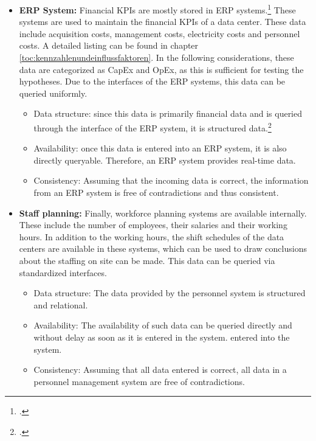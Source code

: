 \begin{itemize}
    \item \textbf{ERP System: }Financial \acp{KPI} are mostly stored in \ac{ERP} systems.\footcite[Cf.][Table 3]{spathis2003usefulness}
    These systems are used to maintain the financial \acp{KPI}
    of a data center. These data include acquisition costs, management costs,
    electricity costs and personnel costs. A detailed listing can be found in
    chapter \ref{toc:kennzahlenundeinflussfaktoren}. In the following considerations, these data are categorized as
    \ac{CapEx} and \ac{OpEx}, as this is sufficient for testing the hypotheses. Due to the interfaces
    of the ERP systems, this data can be queried uniformly.
    \begin{itemize}
        \item Data structure: since this data is primarily financial data and is queried through the interface
        of the ERP system, it is structured data.\footcite[Cf.][p. 27]{kimble2015big}
        \item Availability: once this data is entered into an \ac{ERP} system, it is also directly queryable.
        Therefore, an \ac{ERP} system provides real-time data.
        \item Consistency: Assuming that the incoming data is correct, the information from
        an \ac{ERP} system is free of contradictions and thus consistent.
    \end{itemize}
    \item \textbf{Staff planning: }Finally, workforce planning systems are available internally. These
    include the number of employees, their salaries and their working hours. In addition to the working hours, the
    shift schedules of the data centers are available in these systems, which can be used to draw conclusions about the staffing
    on site can be made. This data can be queried via standardized interfaces.
    \begin{itemize}
        \item Data structure: The data provided by the personnel system is structured and relational.
        \item Availability: The availability of such data can be queried directly and without delay as soon as it is entered in the system.
        entered into the system.
        \item Consistency: Assuming that all data entered is correct, all data in a
        personnel management system are free of contradictions.
    \end{itemize}
\end{itemize}

